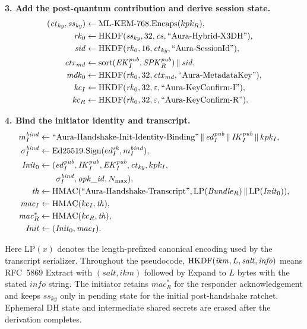 \documentclass[preprint,12pt]{elsarticle}
\theoremstyle{definition}
\newcommand{\tech}[1]{\textnormal{#1}}
\newcommand{\domain}[1]{\textnormal{``#1''}}
\renewcommand{\mathsf}[1]{\mathrm{#1}}
\newcommand{\HKDF}{\tech{HKDF}}
\newcommand{\HMAC}{\tech{HMAC}}
\newcommand{\KEM}{\tech{ML-KEM-768}}
\newcommand{\Encaps}{\tech{Encaps}}
\newcommand{\concat}{\,\|\,}
\newcommand{\rk}{\mathit{rk}}
\newcommand{\mdk}{\mathit{mdk}}
\newcommand{\IK}{\mathit{IK}}
\newcommand{\SPK}{\mathit{SPK}}
\newcommand{\EK}{\mathit{EK}}
\begin{document}
\begin{algorithm}[tbp]
\textbf{3. Add the post-quantum contribution and derive session state.}
\[
\begin{aligned}
(\mathit{ct}_{\mathit{ky}},\mathit{ss}_{\mathit{ky}}) &\gets \KEM.\Encaps(kpk_R),\\
\rk_0 &\gets \HKDF(\mathit{ss}_{\mathit{ky}},32,\mathit{cs},\domain{Aura-Hybrid-X3DH}),\\
\mathit{sid} &\gets \HKDF(\rk_0,16,\mathit{ct}_{\mathit{ky}},\domain{Aura-SessionId}),\\
\mathit{ctx}_{\mathit{md}} &\gets
  \mathrm{sort}(\EK_I^{\mathit{pub}},\SPK_R^{\mathit{pub}})\concat\mathit{sid},\\
\mdk_0 &\gets \HKDF(\rk_0,32,\mathit{ctx}_{\mathit{md}},\domain{Aura-MetadataKey}),\\
\mathit{kc}_I &\gets \HKDF(\rk_0,32,\varepsilon,\domain{Aura-KeyConfirm-I}),\\
\mathit{kc}_R &\gets \HKDF(\rk_0,32,\varepsilon,\domain{Aura-KeyConfirm-R}).
\end{aligned}
\]

\textbf{4. Bind the initiator identity and transcript.}
\[
\begin{aligned}
m_I^{\mathit{bind}} &\gets
  \domain{Aura-Handshake-Init-Identity-Binding}
  \concat \mathit{ed}_I^{\mathit{pub}}\concat\IK_I^{\mathit{pub}}\concat kpk_I,\\
\sigma_I^{\mathit{bind}} &\gets
  \tech{Ed25519.Sign}(ed_I^{\mathit{sk}},m_I^{\mathit{bind}}),\\
\mathit{Init}_0 &\gets
  (\mathit{ed}_I^{\mathit{pub}},\IK_I^{\mathit{pub}},
  \EK_I^{\mathit{pub}},\mathit{ct}_{\mathit{ky}},kpk_I,\\
&\qquad \sigma_I^{\mathit{bind}},\mathit{opk\_id},N_{\max}),\\
\mathit{th} &\gets
  \HMAC(\domain{Aura-Handshake-Transcript},
  \mathsf{LP}(\mathit{Bundle}_R)\concat\mathsf{LP}(\mathit{Init}_0)),\\
\mathit{mac}_I &\gets \HMAC(\mathit{kc}_I,\mathit{th}),\\
\mathit{mac}_R^* &\gets \HMAC(\mathit{kc}_R,\mathit{th}),\\
\mathit{Init} &\gets(\mathit{Init}_0,\mathit{mac}_I).
\end{aligned}
\]
\end{algorithm}
\endgroup

Here $\mathsf{LP}(x)$ denotes the length-prefixed canonical encoding used by the transcript serializer.
Throughout the pseudocode, $\HKDF(\mathit{ikm},L,\mathit{salt},\mathit{info})$
means RFC~5869 Extract with $(\mathit{salt},\mathit{ikm})$ followed by Expand
to $L$ bytes with the stated $\mathit{info}$ string.
The initiator retains $\mathit{mac}_R^*$ for the responder acknowledgement and
keeps $\mathit{ss}_{\mathit{ky}}$ only in pending state for the initial
post-handshake ratchet. Ephemeral DH state and intermediate shared secrets are
erased after the derivation completes.
\end{document}
